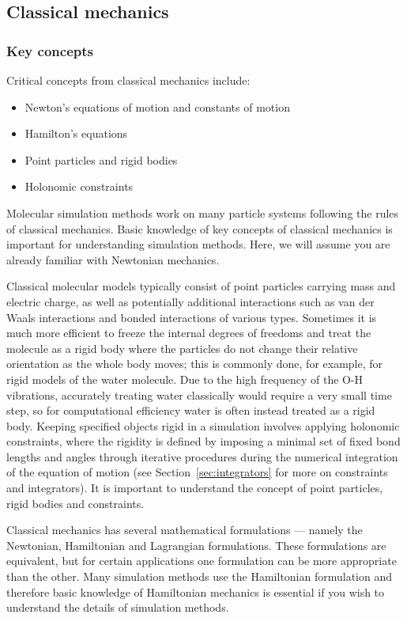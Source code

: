 \documentclass[9pt,bestpractices]{livecoms}
\begin{document}
\subsection{Classical mechanics}
\label{sec:classical_mechanics}
\subsubsection{Key concepts}

Critical concepts from classical mechanics include:
\begin{itemize}
\item Newton's equations of motion and constants of motion
\item Hamilton's equations
\item Point particles and rigid bodies
\item Holonomic constraints
\end{itemize}

Molecular simulation methods work on many particle systems following the rules of classical mechanics. 
Basic knowledge of key concepts of classical mechanics is important for understanding simulation methods.
Here, we will assume you are already familiar with Newtonian mechanics.

Classical molecular models typically consist of point particles carrying mass and electric charge, as well as potentially additional interactions such as van der Waals interactions and bonded interactions of various types.
Sometimes it is much more efficient to freeze the internal degrees of freedoms and treat the molecule as a rigid body where the particles do not change their relative orientation as the whole body moves; this is commonly done, for example, for rigid models of the water molecule.
Due to the high frequency of the O-H vibrations, accurately treating water classically would require a very small time step, so for computational efficiency water is often instead treated as a rigid body.
Keeping specified objects rigid in a simulation involves applying holonomic constraints, where the rigidity is defined by imposing a minimal set of fixed bond lengths and angles through iterative procedures during the numerical integration of the equation of motion (see Section~\ref{sec:integrators} for more on constraints and integrators).
It is important to understand the concept of point particles, rigid bodies and constraints.

Classical mechanics has several mathematical formulations --- namely the Newtonian, Hamiltonian and Lagrangian formulations.
These formulations are equivalent, but for certain applications one formulation can be more appropriate than the other. 
Many simulation methods use the Hamiltonian formulation and therefore basic knowledge of Hamiltonian mechanics is essential if you wish to understand the details of simulation methods.
\end{document}
